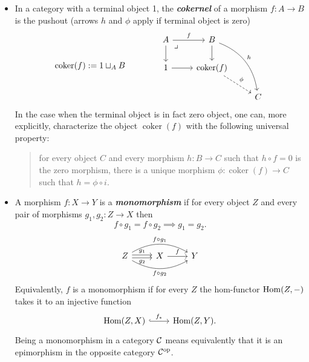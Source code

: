 \begin{defn}
\begin{itemize}
		More explicitly, this characterizes the object $\ker(f)$ as \textit{the} object (unique up to isomorphism) that satisfies the following universal property:
		\begin{quote}
			for every object $C$ and every morphism $h:C\to A$ such that $f\circ h=0$ is the zero morphism, there is a unique morphism $\phi:C\to\ker(f)$ such that $h=p\circ\phi$.
		\end{quote}
		\[\begin{tikzcd}
			C\arrow[dr,dashed,"\phi"]\arrow[ddr,bend right,swap,"h"]\\
			&\ker(f)\arrow[d]\arrow[r]&0\arrow[d]\\
			&A\arrow[r,"f",swap]&B\arrow[ul, phantom, "\ulcorner", very near start]
		\end{tikzcd}\]
		\item In a category with a terminal object 1, the \textbf{\textit{cokernel}} of a morphism $f:A\to B$ is the pushout (arrows $h$ and $\phi$ apply if terminal object is zero)
		\[\operatorname{coker}(f):=1\sqcup_AB\qquad\qquad\begin{tikzcd}
			A\arrow[r,"f"]\arrow[d]\arrow[dr, phantom, "\lrcorner", very near start]&B\arrow[d]\arrow[rdd,bend left,"h"]\\
			1\arrow[r]&\operatorname{coker}(f)\arrow[dr,dashed,"\phi"]\\
			&&C
		\end{tikzcd}\]
		In the case when the terminal object is in fact zero object, one can, more explicitly, characterize the object $\operatorname{coker}(f)$ with the following universal property:
		\begin{quote}
			for every object $C$ and every morphism $h:B\to C$ such that $h\circ f=0$ is the zero morphism, there is a unique morphism $\phi:\operatorname{coker}(f)\to C$ such that $h=\phi\circ i$.
		\end{quote}
		
		\item A morphism $f:X\to Y$ is a \textbf{\textit{monomorphism}} if for every object $Z$ and every pair of morphisms $g_1,g_2:Z\to X$ then
		\[f\circ g_1=f\circ g_2\implies g_1=g_2.\]
		\[\begin{tikzcd}
			Z\arrow[r,shift={(0,.06)},"g_1"]\arrow[r,swap,shift={(0,-.06)},"g_2"]\arrow[rr,bend left,"f\circ g_1"]\arrow[rr,bend right,swap,"f\circ g_2"]&X\arrow[r,"f"]&Y
		\end{tikzcd}\]
		Equivalently, $f$ is a monomorphism if for every $Z$ the hom-functor $\operatorname{Hom}(Z,-)$ takes it to an injective function
		\[\begin{tikzcd}
			\Hom(Z,X)\arrow[r,hook,"f_*"]&\Hom(Z,Y).
		\end{tikzcd}\]
		Being a monomorphism in a category $\mathcal{C}$ means equivalently that it is an epimorphism in the opposite category $\mathcal{C}^{\operatorname{op}}$.
		

\end{itemize}
\end{defn}
